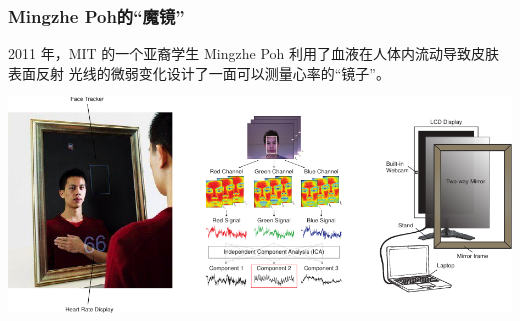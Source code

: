 \documentclass[xcolor=svgnames,serif,table,10pt]{beamer}
\begin{document}
\begin{frame}
  \frametitle{Mingzhe Poh的“魔镜”}
  \small
  2011 年，MIT 的一个亚裔学生 Mingzhe Poh 利用了血液在人体内流动导致皮肤表面反射
  光线的微弱变化设计了一面可以测量心率的“镜子”\cite{poh2011medical}。

  \medskip
\begin{center}
    \includegraphics[width=\textwidth]{mirror.pdf}
  \end{center}
\end{frame}
\end{document}

